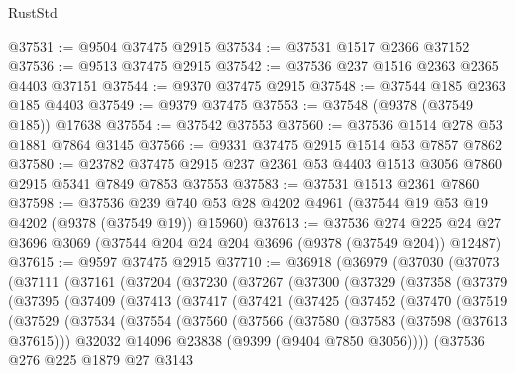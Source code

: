 \begin{lexlean}{RustStd}
\begin{coremodule}
@37531 := @9504 @37475 @2915
@37534 := @37531 @1517 @2366 @37152
@37536 := @9513 @37475 @2915
@37542 := @37536 @237 @1516 @2363 @2365 @4403 @37151
@37544 := @9370 @37475 @2915
@37548 := @37544 @185 @2363 @185 @4403
@37549 := @9379 @37475
@37553 := @37548 (@9378 (@37549 @185)) @17638
@37554 := @37542 @37553
@37560 := @37536 @1514 @278 @53 @1881 @7864 @3145
@37566 := @9331 @37475 @2915 @1514 @53 @7857 @7862
@37580 := @23782 @37475 @2915 @237 @2361 @53 @4403 @1513 @3056 @7860 @2915 @5341 @7849 @7853 @37553
@37583 := @37531 @1513 @2361 @7860
@37598 := @37536
    @239
    @740
    @53
    @28
    @4202
    @4961
    (@37544 @19 @53 @19 @4202 (@9378 (@37549 @19)) @15960)
@37613 := @37536
    @274
    @225
    @24
    @27
    @3696
    @3069
    (@37544 @204 @24 @204 @3696 (@9378 (@37549 @204)) @12487)
@37615 := @9597 @37475 @2915
@37710 := @36918
    (@36979
      (@37030
        (@37073
          (@37111
            (@37161
              (@37204
                (@37230
                  (@37267
                    (@37300
                      (@37329
                        (@37358
                          (@37379
                            (@37395
                              (@37409
                                (@37413
                                  (@37417
                                    (@37421
                                      (@37425
                                        (@37452
                                          (@37470
                                            (@37519
                                              (@37529
                                                (@37534
                                                  (@37554
                                                    (@37560
                                                      (@37566
                                                        (@37580
                                                          (@37583 (@37598 (@37613 @37615)))
                                                          @32032
                                                          @14096
                                                          @23838
                                                          (@9399 (@9404 @7850 @3056))))
                                                      (@37536
                                                        @276
                                                        @225
                                                        @1879
                                                        @27
                                                        @3143

\end{coremodule}
\end{lexlean}
